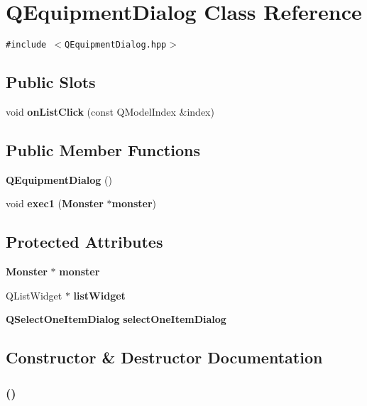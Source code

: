 \section{QEquipment\-Dialog Class Reference}
\label{classQEquipmentDialog}
{\tt \#include $<$QEquipment\-Dialog.hpp$>$}

\subsection*{Public Slots}
\begin{CompactItemize}
\item 
void {\bf on\-List\-Click} (const QModel\-Index \&index)
\end{CompactItemize}
\subsection*{Public Member Functions}
\begin{CompactItemize}
\item 
{\bf QEquipment\-Dialog} ()
\item 
void {\bf exec1} ({\bf Monster} $\ast${\bf monster})
\end{CompactItemize}
\subsection*{Protected Attributes}
\begin{CompactItemize}
\item 
{\bf Monster} $\ast$ {\bf monster}
\item 
QList\-Widget $\ast$ {\bf list\-Widget}
\item 
{\bf QSelect\-One\-Item\-Dialog} {\bf select\-One\-Item\-Dialog}
\end{CompactItemize}


\subsection{Constructor \& Destructor Documentation}
\subsubsection{ ()}\label{classQEquipmentDialog_a0}




